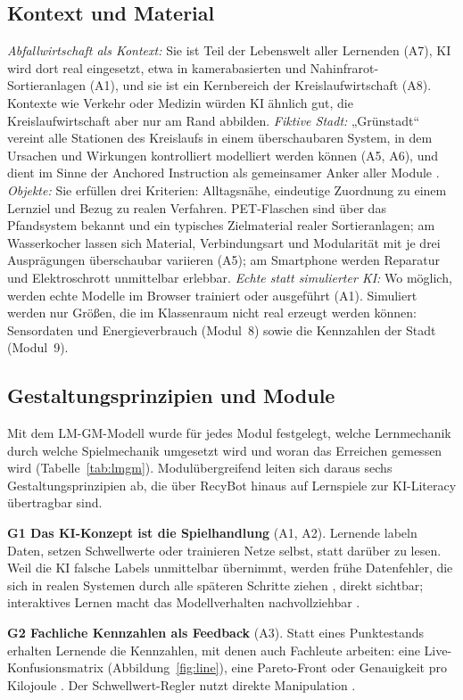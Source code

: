 \documentclass[sigconf,nonacm]{acmart}
\begin{document}
\subsection{Kontext und Material}
\textit{Abfallwirtschaft als Kontext:} Sie ist Teil der Lebenswelt aller Lernenden (A7), KI wird dort real eingesetzt, etwa in kamerabasierten und Nahinfrarot-Sortieranlagen (A1), und sie ist ein Kernbereich der Kreislaufwirtschaft (A8). Kontexte wie Verkehr oder Medizin würden KI ähnlich gut, die Kreislaufwirtschaft aber nur am Rand abbilden.
\textit{Fiktive Stadt:} „Grünstadt“ vereint alle Stationen des Kreislaufs in einem überschaubaren System, in dem Ursachen und Wirkungen kontrolliert modelliert werden können (A5, A6), und dient im Sinne der Anchored Instruction als gemeinsamer Anker aller Module \cite{ctgv1990}.
\textit{Objekte:} Sie erfüllen drei Kriterien: Alltagsnähe, eindeutige Zuordnung zu einem Lernziel und Bezug zu realen Verfahren. PET-Flaschen sind über das Pfandsystem bekannt und ein typisches Zielmaterial realer Sortieranlagen; am Wasserkocher lassen sich Material, Verbindungsart und Modularität mit je drei Ausprägungen überschaubar variieren (A5); am Smartphone werden Reparatur und Elektroschrott unmittelbar erlebbar.
\textit{Echte statt simulierter KI:} Wo möglich, werden echte Modelle im Browser trainiert oder ausgeführt (A1). Simuliert werden nur Größen, die im Klassenraum nicht real erzeugt werden können: Sensordaten und Energieverbrauch (Modul~8) sowie die Kennzahlen der Stadt (Modul~9).
\subsection{Gestaltungsprinzipien und Module}
Mit dem LM-GM-Modell \cite{arnab2015} wurde für jedes Modul festgelegt, welche Lernmechanik durch welche Spielmechanik umgesetzt wird und woran das Erreichen gemessen wird (Tabelle~\ref{tab:lmgm}). Modulübergreifend leiten sich daraus sechs Gestaltungsprinzipien ab, die über RecyBot hinaus auf Lernspiele zur KI-Literacy übertragbar sind.

\textbf{G1 Das KI-Konzept ist die Spielhandlung} (A1, A2). Lernende labeln Daten, setzen Schwellwerte oder trainieren Netze selbst, statt darüber zu lesen. Weil die KI falsche Labels unmittelbar übernimmt, werden frühe Datenfehler, die sich in realen Systemen durch alle späteren Schritte ziehen \cite{sambasivan2021}, direkt sichtbar; interaktives Lernen macht das Modellverhalten nachvollziehbar \cite{amershi2014}.

\textbf{G2 Fachliche Kennzahlen als Feedback} (A3). Statt eines Punktestands erhalten Lernende die Kennzahlen, mit denen auch Fachleute arbeiten: eine Live-Konfusionsmatrix \cite{fawcett2006} (Abbildung~\ref{fig:line}), eine Pareto-Front oder Genauigkeit pro Kilojoule \cite{schwartz2020,strubell2019}. Der Schwellwert-Regler nutzt direkte Manipulation \cite{shneiderman1983}.
\end{document}
